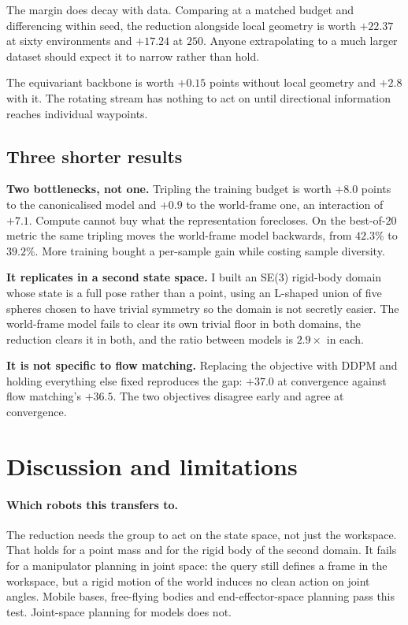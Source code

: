 \documentclass[11pt,a4paper]{article}
\begin{document}
The margin does decay with data. Comparing at a matched budget and differencing
within seed, the reduction alongside local geometry is worth $+22.37$ at
sixty environments and $+17.24$ at $250$. Anyone extrapolating to a much
larger dataset should expect it to narrow rather than hold.

The equivariant backbone is worth $+0.15$ points without local geometry and
$+2.8$ with it. The rotating stream has nothing to act on until directional
information reaches individual waypoints.

\subsection{Three shorter results}

\textbf{Two bottlenecks, not one.} Tripling the training budget is worth $+8.0$
points to the canonicalised model and $+0.9$ to the world-frame one, an interaction
of $+7.1$. Compute cannot buy what the representation forecloses. On the
best-of-$20$ metric the same tripling moves the world-frame model backwards, from
$42.3\%$ to $39.2\%$. More training bought a per-sample gain while costing sample
diversity.

\textbf{It replicates in a second state space.} I built an SE(3) rigid-body
domain whose state is a full pose rather than a point, using an L-shaped union of
five spheres chosen to have trivial symmetry so the domain is not secretly
easier. The world-frame model fails to clear its own trivial floor in both domains,
the reduction clears it in both, and the ratio between models is $2.9\times$ in
each.

\textbf{It is not specific to flow matching.} Replacing the objective with DDPM
and holding everything else fixed reproduces the gap: $+37.0$ at convergence
against flow matching's $+36.5$. The two objectives disagree early and agree at
convergence.

\section{Discussion and limitations}
\label{sec:limits}

\paragraph{Which robots this transfers to.} The reduction needs the group to act
on the state space, not just the workspace. That holds for a point mass and for
the rigid body of the second domain. It fails for a manipulator planning in joint
space: the query still defines a frame in the workspace, but a rigid motion of
the world induces no clean action on joint angles. Mobile bases, free-flying
bodies and end-effector-space planning pass this test. Joint-space planning for
models does not.
\end{document}
